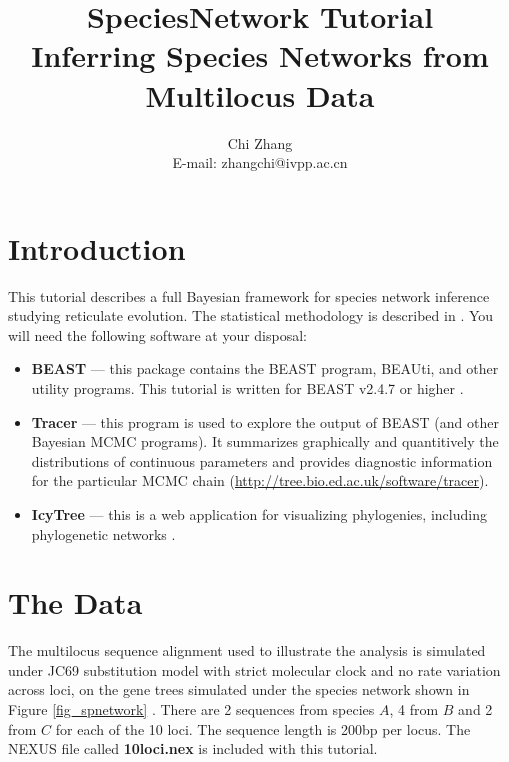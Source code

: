 \documentclass[11pt]{article}
\begin{document}
\title{SpeciesNetwork Tutorial \\
\large Inferring Species Networks from Multilocus Data}
\author{Chi Zhang \\
E-mail: zhangchi@ivpp.ac.cn}
\maketitle

\section*{Introduction}

This tutorial describes a full Bayesian framework for species network inference studying reticulate evolution. The statistical methodology is described in \citet{Zhang:2017gq}.
You will need the following software at your disposal:
\begin{itemize}
\item {\bf BEAST} --- this package contains the BEAST program, BEAUti, and other utility programs. This tutorial is written for BEAST v2.4.7 or higher \citep[\url{http://beast2.org},][]{Bouckaert:2014iz}.
\item {\bf Tracer} --- this program is used to explore the output of BEAST (and other Bayesian MCMC programs). It summarizes graphically and quantitively the distributions of continuous parameters and provides diagnostic information for the particular MCMC chain (\url{http://tree.bio.ed.ac.uk/software/tracer}).
\item {\bf IcyTree} --- this is a web application for visualizing phylogenies, including phylogenetic networks \citep[\url{icytree.org};][]{Vaughan:2017fu}.
\end{itemize}

\section*{The Data}

The multilocus sequence alignment used to illustrate the analysis is simulated under JC69 substitution model \citep{Jukes:1969wx} with strict molecular clock and no rate variation across loci, on the gene trees simulated under the species network shown in Figure \ref{fig_spnetwork} \citep[see also][]{Zhang:2017gq}. There are 2 sequences from species $A$, 4 from $B$ and 2 from $C$ for each of the 10 loci. The sequence length is 200bp per locus. The NEXUS file called {\bf 10loci.nex} is included with this tutorial.
\end{document}
